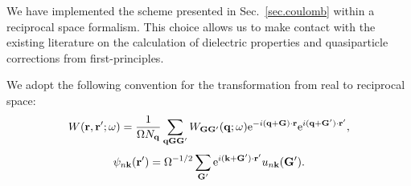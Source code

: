 \documentclass[twocolumn,prb,showpacs,superscriptaddress]{revtex4}
\def\w{\omega}
\def\q{{\bf q}}
\def\k{{\bf k}}
\def\G{{\bf G}}
\def\Gp{{\bf G^\prime}}
\def\r{{\bf r}}
\def\rp{{\bf r^\prime}}
\begin{document}
We have implemented the scheme presented in Sec.\ \ref{sec.coulomb}
within a reciprocal space formalism. This choice allows us to make
contact with the existing literature on the 
calculation of dielectric properties and quasiparticle 
corrections from first-principles.\cite{hl86,balde_tosa,baroni-resta,hl86-prb,reining,cpm}

We adopt the following convention for the transformation from real
to reciprocal space:
  \begin{equation}
  W(\r,\rp;\w) = \frac{1}{\Omega N_\q}  \sum_{\q\G\Gp} W_{\G\Gp}(\q;\w)
  {\rm e}^{-i(\q+\G)\cdot\r}
  {\rm e}^{i(\q+\Gp)\cdot\rp},
  \end{equation}
  \begin{equation}
  \psi_{n\k}(\rp)=\Omega^{-1/2}\sum_\Gp 
  {\rm e}^{i(\k+\Gp)\cdot\rp} u_{n\k}(\Gp).
  \end{equation}
\end{document}
